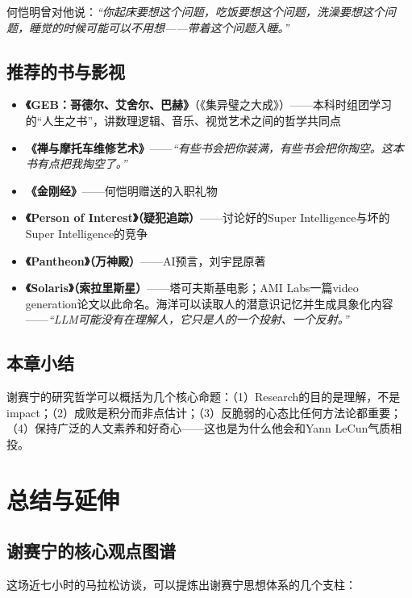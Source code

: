 \documentclass[a4paper]{article}
\begin{document}
何恺明曾对他说：\textit{``你起床要想这个问题，吃饭要想这个问题，洗澡要想这个问题，睡觉的时候可能可以不用想——带着这个问题入睡。''}

\subsection{推荐的书与影视}

\begin{itemize}
    \item \textbf{《GEB：哥德尔、艾舍尔、巴赫》}（《集异璧之大成》）——本科时组团学习的``人生之书''，讲数理逻辑、音乐、视觉艺术之间的哲学共同点
    \item \textbf{《禅与摩托车维修艺术》}——\textit{``有些书会把你装满，有些书会把你掏空。这本书有点把我掏空了。''}
    \item \textbf{《金刚经》}——何恺明赠送的入职礼物
    \item \textbf{《Person of Interest》（疑犯追踪）}——讨论好的Super Intelligence与坏的Super Intelligence的竞争
    \item \textbf{《Pantheon》（万神殿）}——AI预言，刘宇昆原著
    \item \textbf{《Solaris》（索拉里斯星）}——塔可夫斯基电影；AMI Labs一篇video generation论文以此命名。海洋可以读取人的潜意识记忆并生成具象化内容——\textit{``LLM可能没有在理解人，它只是人的一个投射、一个反射。''}
\end{itemize}

\subsection{本章小结}

谢赛宁的研究哲学可以概括为几个核心命题：（1）Research的目的是理解，不是impact；（2）成败是积分而非点估计；（3）反脆弱的心态比任何方法论都重要；（4）保持广泛的人文素养和好奇心——这也是为什么他会和Yann LeCun气质相投。

\section{总结与延伸}

\subsection{谢赛宁的核心观点图谱}

这场近七小时的马拉松访谈，可以提炼出谢赛宁思想体系的几个支柱：
\end{document}
